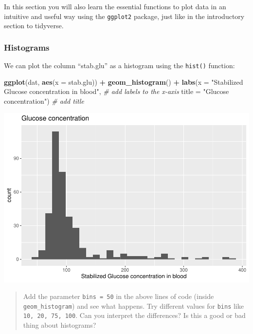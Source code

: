 \documentclass[
]{book}
\newenvironment{Shaded}{\begin{snugshade}}{\end{snugshade}}
\newcommand{\AttributeTok}[1]{\textcolor[rgb]{0.13,0.29,0.53}{#1}}
\newcommand{\CommentTok}[1]{\textcolor[rgb]{0.56,0.35,0.01}{\textit{#1}}}
\newcommand{\FunctionTok}[1]{\textcolor[rgb]{0.13,0.29,0.53}{\textbf{#1}}}
\newcommand{\NormalTok}[1]{#1}
\newcommand{\SpecialCharTok}[1]{\textcolor[rgb]{0.81,0.36,0.00}{\textbf{#1}}}
\newcommand{\StringTok}[1]{\textcolor[rgb]{0.31,0.60,0.02}{#1}}
\begin{document}
In this section you will also learn the essential functions to plot data in an intuitive and useful way using the \texttt{ggplot2} package, just like in the introductory section to tidyverse.

\hypertarget{histograms}{%
\subsubsection{Histograms}\label{histograms}}

We can plot the column ``stab.glu'' as a histogram using the \texttt{hist()} function:

\begin{Shaded}
\begin{Highlighting}[]
\FunctionTok{ggplot}\NormalTok{(dat,}
       \FunctionTok{aes}\NormalTok{(}\AttributeTok{x =}\NormalTok{ stab.glu)) }\SpecialCharTok{+}
  \FunctionTok{geom\_histogram}\NormalTok{() }\SpecialCharTok{+}
  \FunctionTok{labs}\NormalTok{(}\AttributeTok{x =} \StringTok{"Stabilized Glucose concentration in blood"}\NormalTok{,  }\CommentTok{\# add labels to the x{-}axis}
       \AttributeTok{title =} \StringTok{"Glucose concentration"}\NormalTok{)                  }\CommentTok{\# add title}
\end{Highlighting}
\end{Shaded}

\includegraphics{_main_files/figure-latex/unnamed-chunk-47-1.pdf}

\begin{quote}
Add the parameter \texttt{bins\ =\ 50} in the above lines of code (inside \texttt{geom\_histogram}) and see what happens.
Try different values for \texttt{bins} like \texttt{10,\ 20,\ 75,\ 100}. Can you interpret the differences?
Is this a good or bad thing about histograms?
\end{quote}
\end{document}
